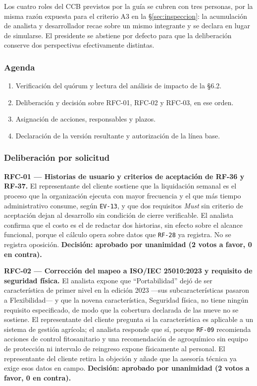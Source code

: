 \documentclass[11pt,letterpaper]{article}
\newcommand{\id}[1]{\texttt{#1}}
\begin{document}
\noindent
Los cuatro roles del CCB previstos por la guía se cubren con tres personas, por la misma razón
expuesta para el criterio A3 en la \S\ref{sec:inspeccion}: la acumulación de analista y desarrollador
recae sobre un mismo integrante y se declara en lugar de simularse. El presidente se abstiene por
defecto para que la deliberación conserve dos perspectivas efectivamente distintas.

\subsubsection*{Agenda}

\begin{enumerate}[leftmargin=*, nosep]
  \item Verificación del quórum y lectura del análisis de impacto de la \S6.2.
  \item Deliberación y decisión sobre RFC-01, RFC-02 y RFC-03, en ese orden.
  \item Asignación de acciones, responsables y plazos.
  \item Declaración de la versión resultante y autorización de la línea base.
\end{enumerate}

\subsubsection*{Deliberación por solicitud}

\noindent\textbf{RFC-01 --- Historias de usuario y criterios de aceptación de RF-36 y RF-37.}
El representante del cliente sostiene que la liquidación semanal es el proceso que la organización
ejecuta con mayor frecuencia y el que más tiempo administrativo consume, según \id{EV-13}, y que dos
requisitos \emph{Must} sin criterio de aceptación dejan al desarrollo sin condición de cierre
verificable. El analista confirma que el costo es el de redactar dos historias, sin efecto sobre el
alcance funcional, porque el cálculo opera sobre datos que \id{RF-28} ya registra. No se registra
oposición. \textbf{Decisión: aprobado por unanimidad (2 votos a favor, 0 en contra).}

\noindent\textbf{RFC-02 --- Corrección del mapeo a ISO/IEC 25010:2023 y requisito de seguridad
física.} El analista expone que ``Portabilidad'' dejó de ser característica de primer nivel en la
edición 2023 ---sus subcaracterísticas pasaron a Flexibilidad--- y que la novena característica,
Seguridad física, no tiene ningún requisito especificado, de modo que la cobertura declarada de las
nueve no se sostiene. El representante del cliente pregunta si la característica es aplicable a un
sistema de gestión agrícola; el analista responde que sí, porque \id{RF-09} recomienda acciones de
control fitosanitario y una recomendación de agroquímico sin equipo de protección ni intervalo de
reingreso expone físicamente al personal. El representante del cliente retira la objeción y añade
que la asesoría técnica ya exige esos datos en campo. \textbf{Decisión: aprobado por unanimidad
(2 votos a favor, 0 en contra).}
\end{document}
